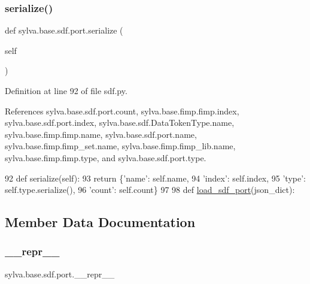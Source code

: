 \subsubsection{\texorpdfstring{serialize()}{serialize()}}
{\footnotesize\ttfamily def sylva.\+base.\+sdf.\+port.\+serialize (\begin{DoxyParamCaption}\item[{}]{self }\end{DoxyParamCaption})}



Definition at line 92 of file sdf.\+py.



References sylva.\+base.\+sdf.\+port.\+count, sylva.\+base.\+fimp.\+fimp.\+index, sylva.\+base.\+sdf.\+port.\+index, sylva.\+base.\+sdf.\+Data\+Token\+Type.\+name, sylva.\+base.\+fimp.\+fimp.\+name, sylva.\+base.\+sdf.\+port.\+name, sylva.\+base.\+fimp.\+fimp\+\_\+set.\+name, sylva.\+base.\+fimp.\+fimp\+\_\+lib.\+name, sylva.\+base.\+fimp.\+fimp.\+type, and sylva.\+base.\+sdf.\+port.\+type.


\begin{DoxyCode}
92         \textcolor{keyword}{def }serialize(self):
93             \textcolor{keywordflow}{return} \{\textcolor{stringliteral}{'name'}: self.name,
94                     \textcolor{stringliteral}{'index'}: self.index,
95                     \textcolor{stringliteral}{'type'}: self.type.serialize(),
96                     \textcolor{stringliteral}{'count'}: self.count\}
97 
98     \textcolor{keyword}{def }\hyperlink{namespacesylva_1_1base_1_1sdf_a72bbd0e1cd0a666269ac3f17427954b8}{load\_sdf\_port}(json\_dict):
\end{DoxyCode}


\subsection{Member Data Documentation}
\mbox{\label{classsylva_1_1base_1_1sdf_1_1port_a14e2fb1373bce5c98b5f779012db8a0b}} 
\subsubsection{\texorpdfstring{\+\_\+\+\_\+repr\+\_\+\+\_\+}{\_\_repr\_\_}}
{\footnotesize\ttfamily sylva.\+base.\+sdf.\+port.\+\_\+\+\_\+repr\+\_\+\+\_\+\hspace{0.3cm}{\ttfamily [private]}}



